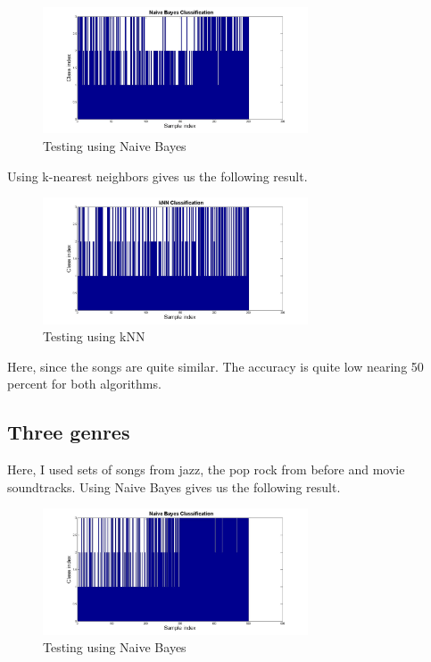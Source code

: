 \documentclass[a4paper]{article}
\begin{document}
\begin{figure}[H] 
	\centering
	\includegraphics[width=0.7\textwidth]{nb3.jpg}
	\caption{Testing using Naive Bayes}	
\end{figure}


Using k-nearest neighbors gives us the following result.


\begin{figure}[H] 
	\centering
	\includegraphics[width=0.7\textwidth]{knn3.jpg}
	\caption{Testing using kNN}	
\end{figure}

Here, since the songs are quite similar. The accuracy is quite low nearing 50 percent for both algorithms.

\subsection{Three genres}

Here, I used sets of songs from jazz, the pop rock from before and movie soundtracks. Using Naive Bayes gives us the following result.


\begin{figure}[H] 
	\centering
	\includegraphics[width=0.7\textwidth]{nbgenre.jpg}
	\caption{Testing using Naive Bayes}	
\end{figure}
\end{document}
